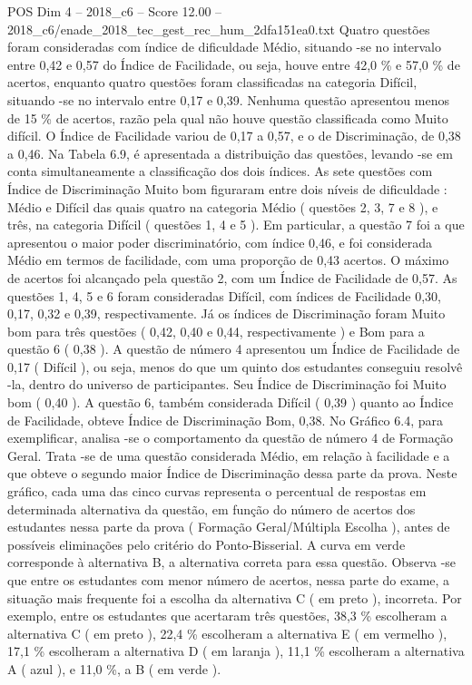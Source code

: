 \begin{textsample}{POS Dim 4 – 2018\_c6 – Score 12.00 – 2018\_c6/enade\_2018\_tec\_gest\_rec\_hum\_2dfa151ea0.txt}
Quatro questões foram consideradas com índice de dificuldade Médio, situando -se no intervalo entre 0,42 e 0,57 do Índice de Facilidade, ou seja, houve entre 42,0 \% e 57,0 \% de acertos, enquanto quatro questões foram classificadas na categoria Difícil, situando -se no intervalo entre 0,17 e 0,39.
Nenhuma questão apresentou menos de 15 \% de acertos, razão pela qual não houve questão classificada como Muito difícil.
O Índice de Facilidade variou de 0,17 a 0,57, e o de Discriminação, de 0,38 a 0,46.
Na Tabela 6.9, é apresentada a distribuição das questões, levando -se em conta simultaneamente a classificação dos dois índices.
As sete questões com Índice de Discriminação Muito bom figuraram entre dois níveis de dificuldade : Médio e Difícil das quais quatro na categoria Médio ( questões 2, 3, 7 e 8 ), e três, na categoria Difícil ( questões 1, 4 e 5 ).
Em particular, a questão 7 foi a que apresentou o maior poder discriminatório, com índice 0,46, e foi considerada Médio em termos de facilidade, com uma proporção de 0,43 acertos.
O máximo de acertos foi alcançado pela questão 2, com um Índice de Facilidade de 0,57.
As questões 1, 4, 5 e 6 foram consideradas Difícil, com índices de Facilidade 0,30, 0,17, 0,32 e 0,39, respectivamente.
Já os índices de Discriminação foram Muito bom para três questões ( 0,42, 0,40 e 0,44, respectivamente ) e Bom para a questão 6 ( 0,38 ).
A questão de número 4 apresentou um Índice de Facilidade de 0,17 ( Difícil ), ou seja, menos do que um quinto dos estudantes conseguiu resolvê -la, dentro do universo de participantes.
Seu Índice de Discriminação foi Muito bom ( 0,40 ).
A questão 6, também considerada Difícil ( 0,39 ) quanto ao Índice de Facilidade, obteve Índice de Discriminação Bom, 0,38.
No Gráfico 6.4, para exemplificar, analisa -se o comportamento da questão de número 4 de Formação Geral.
Trata -se de uma questão considerada Médio, em relação à facilidade e a que obteve o segundo maior Índice de Discriminação dessa parte da prova.
Neste gráfico, cada uma das cinco curvas representa o percentual de respostas em determinada alternativa da questão, em função do número de acertos dos estudantes nessa parte da prova ( Formação Geral/Múltipla Escolha ), antes de possíveis eliminações pelo critério do Ponto-Bisserial.
A curva em verde corresponde à alternativa B, a alternativa correta para essa questão.
Observa -se que entre os estudantes com menor número de acertos, nessa parte do exame, a situação mais frequente foi a escolha da alternativa C ( em preto ), incorreta.
Por exemplo, entre os estudantes que acertaram três questões, 38,3 \% escolheram a alternativa C ( em preto ), 22,4 \% escolheram a alternativa E ( em vermelho ), 17,1 \% escolheram a alternativa D ( em laranja ), 11,1 \% escolheram a alternativa A ( azul ), e 11,0 \%, a B ( em verde ).

\end{textsample}
